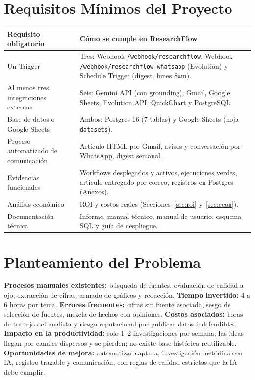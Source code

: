 \documentclass[11pt,a4paper]{article}
\newcommand{\code}[1]{\texttt{\small #1}}
\begin{document}
\section{Requisitos Mínimos del Proyecto}
\renewcommand{\arraystretch}{1.3}
\begin{longtable}{L{5.3cm} L{9.7cm}}
\toprule
\textbf{Requisito obligatorio} & \textbf{Cómo se cumple en ResearchFlow}\\
\midrule \endhead
Un Trigger & Tres: Webhook \code{/webhook/researchflow}, Webhook \code{/webhook/researchflow-whatsapp} (Evolution) y Schedule Trigger (digest, lunes 8am).\\
Al menos tres integraciones externas & Seis: Gemini API (con grounding), Gmail, Google Sheets, Evolution API, QuickChart y PostgreSQL.\\
Base de datos o Google Sheets & Ambos: Postgres 16 (7 tablas) y Google Sheets (hoja \code{datasets}).\\
Proceso automatizado de comunicación & Artículo HTML por Gmail, avisos y conversación por WhatsApp, digest semanal.\\
Evidencias funcionales & Workflows desplegados y activos, ejecuciones verdes, artículo entregado por correo, registros en Postgres (Anexos).\\
Análisis económico & ROI y costos reales (Secciones~\ref{sec:roi} y~\ref{sec:econ}).\\
Documentación técnica & Informe, manual técnico, manual de usuario, esquema SQL y guía de despliegue.\\
\bottomrule
\end{longtable}

\section{Planteamiento del Problema}
\textbf{Procesos manuales existentes:} búsqueda de fuentes, evaluación de calidad a ojo, extracción de cifras, armado de gráficos y redacción. \textbf{Tiempo invertido:} 4 a 6 horas por tema. \textbf{Errores frecuentes:} cifras sin fuente asociada, sesgo de selección de fuentes, mezcla de hechos con opiniones. \textbf{Costos asociados:} horas de trabajo del analista y riesgo reputacional por publicar datos indefendibles. \textbf{Impacto en la productividad:} solo 1--2 investigaciones por semana; las ideas llegan por canales dispersos y se pierden; no existe base histórica reutilizable. \textbf{Oportunidades de mejora:} automatizar captura, investigación metódica con IA, registro trazable y comunicación, con reglas de calidad estrictas que la IA debe cumplir.
\end{document}
